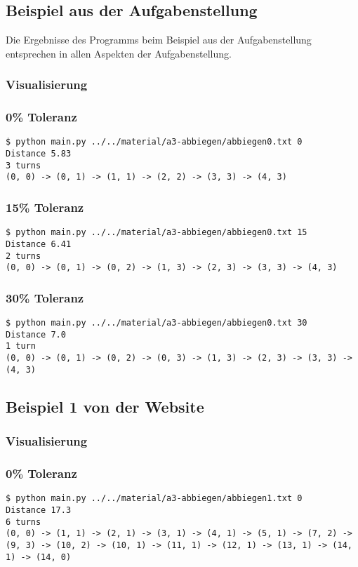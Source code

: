 \documentclass[a4paper,10pt,ngerman]{scrartcl}
\begin{document}
\subsection{Beispiel aus der Aufgabenstellung}
Die Ergebnisse des Programms beim Beispiel aus der Aufgabenstellung entsprechen in allen Aspekten der Aufgabenstellung.
\subsubsection{Visualisierung}


\subsubsection{0\% Toleranz}
\begin{lstlisting}
$ python main.py ../../material/a3-abbiegen/abbiegen0.txt 0
Distance 5.83
3 turns
(0, 0) -> (0, 1) -> (1, 1) -> (2, 2) -> (3, 3) -> (4, 3)
\end{lstlisting}

\subsubsection{15\% Toleranz}
\begin{lstlisting}
$ python main.py ../../material/a3-abbiegen/abbiegen0.txt 15
Distance 6.41
2 turns
(0, 0) -> (0, 1) -> (0, 2) -> (1, 3) -> (2, 3) -> (3, 3) -> (4, 3) 
\end{lstlisting}

\subsubsection{30\% Toleranz}
\begin{lstlisting}
$ python main.py ../../material/a3-abbiegen/abbiegen0.txt 30
Distance 7.0
1 turn
(0, 0) -> (0, 1) -> (0, 2) -> (0, 3) -> (1, 3) -> (2, 3) -> (3, 3) -> (4, 3)
\end{lstlisting}

\subsection{Beispiel 1 von der Website}
\subsubsection{Visualisierung}


\subsubsection{0\% Toleranz}
\begin{lstlisting}
$ python main.py ../../material/a3-abbiegen/abbiegen1.txt 0
Distance 17.3
6 turns
(0, 0) -> (1, 1) -> (2, 1) -> (3, 1) -> (4, 1) -> (5, 1) -> (7, 2) -> (9, 3) -> (10, 2) -> (10, 1) -> (11, 1) -> (12, 1) -> (13, 1) -> (14, 1) -> (14, 0)
\end{lstlisting}
\end{document}
